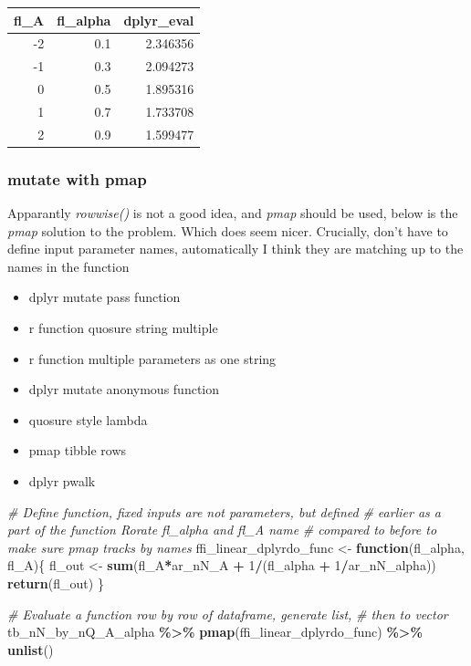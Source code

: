 \documentclass[
]{book}
\newenvironment{Shaded}{\begin{snugshade}}{\end{snugshade}}
\newcommand{\CommentTok}[1]{\textcolor[rgb]{0.56,0.35,0.01}{\textit{#1}}}
\newcommand{\ControlFlowTok}[1]{\textcolor[rgb]{0.13,0.29,0.53}{\textbf{#1}}}
\newcommand{\DecValTok}[1]{\textcolor[rgb]{0.00,0.00,0.81}{#1}}
\newcommand{\KeywordTok}[1]{\textcolor[rgb]{0.13,0.29,0.53}{\textbf{#1}}}
\newcommand{\NormalTok}[1]{#1}
\newcommand{\OperatorTok}[1]{\textcolor[rgb]{0.81,0.36,0.00}{\textbf{#1}}}
\newcommand{\StringTok}[1]{\textcolor[rgb]{0.31,0.60,0.02}{#1}}
\providecommand{\tightlist}{%
  \setlength{\itemsep}{0pt}\setlength{\parskip}{0pt}}
\begin{document}
\begin{table}[!h]
\centering
\begin{tabular}{r|r|r}
\hline
fl\_A & fl\_alpha & dplyr\_eval\\
\hline
\rowcolor{gray!6}  -2 & 0.1 & 2.346356\\
\hline
-1 & 0.3 & 2.094273\\
\hline
\rowcolor{gray!6}  0 & 0.5 & 1.895316\\
\hline
1 & 0.7 & 1.733708\\
\hline
\rowcolor{gray!6}  2 & 0.9 & 1.599477\\
\hline
\end{tabular}
\end{table}

\hypertarget{mutate-with-pmap}{%
\subsubsection{mutate with pmap}\label{mutate-with-pmap}}

Apparantly \emph{rowwise()} is not a good idea, and \emph{pmap} should be used, below is the \emph{pmap} solution to the problem. Which does seem nicer. Crucially, don't have to define input parameter names, automatically I think they are matching up to the names in the function

\begin{itemize}
\tightlist
\item
  dplyr mutate pass function
\item
  r function quosure string multiple
\item
  r function multiple parameters as one string
\item
  dplyr mutate anonymous function
\item
  quosure style lambda
\item
  pmap tibble rows
\item
  dplyr pwalk
\end{itemize}

\begin{Shaded}
\begin{Highlighting}[]
\CommentTok{\# Define function, fixed inputs are not parameters, but defined}
\CommentTok{\# earlier as a part of the function Rorate fl\_alpha and fl\_A name}
\CommentTok{\# compared to before to make sure pmap tracks by names}
\NormalTok{ffi\_linear\_dplyrdo\_func \textless{}{-}}\StringTok{ }\ControlFlowTok{function}\NormalTok{(fl\_alpha, fl\_A)\{}
\NormalTok{  fl\_out \textless{}{-}}\StringTok{ }\KeywordTok{sum}\NormalTok{(fl\_A}\OperatorTok{*}\NormalTok{ar\_nN\_A }\OperatorTok{+}\StringTok{ }\DecValTok{1}\OperatorTok{/}\NormalTok{(fl\_alpha }\OperatorTok{+}\StringTok{ }\DecValTok{1}\OperatorTok{/}\NormalTok{ar\_nN\_alpha))}
  \KeywordTok{return}\NormalTok{(fl\_out)}
\NormalTok{\}}

\CommentTok{\# Evaluate a function row by row of dataframe, generate list,}
\CommentTok{\# then to vector}
\NormalTok{tb\_nN\_by\_nQ\_A\_alpha }\OperatorTok{\%\textgreater{}\%}\StringTok{ }\KeywordTok{pmap}\NormalTok{(ffi\_linear\_dplyrdo\_func) }\OperatorTok{\%\textgreater{}\%}\StringTok{ }\KeywordTok{unlist}\NormalTok{()}
\end{Highlighting}
\end{Shaded}
\end{document}
